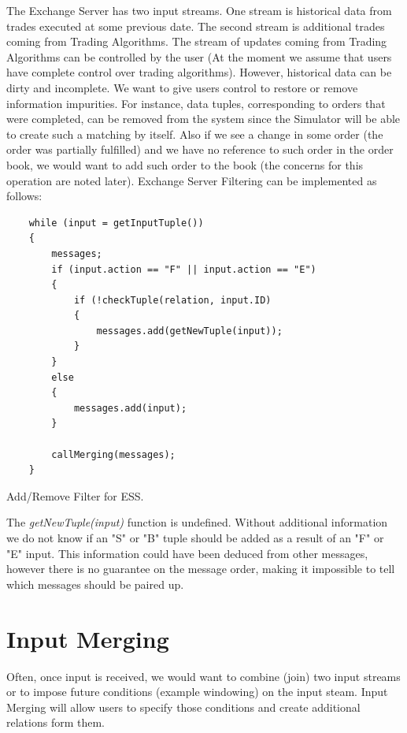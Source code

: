 \documentclass{article}
\begin{document}
The Exchange Server has two input streams. One stream is historical data from trades executed at some previous date. The second stream is additional trades coming from Trading Algorithms. The stream of updates coming from Trading Algorithms can be controlled by the user (At the moment we assume that users have complete control over trading algorithms). However, historical data can be dirty and incomplete. We want to give users control to restore or remove information impurities. For instance, data tuples, corresponding to orders that were completed, can be removed from the system since the Simulator will be able to create such a matching by itself. Also if we see a change in some order (the order was partially fulfilled) and we have no reference to such order in the order book, we would want to add such order to the book (the concerns for this operation are noted later).
Exchange Server Filtering can be implemented as follows:

\begin{program}
    \begin{verbatim}   
    while (input = getInputTuple())
    {
        messages;
        if (input.action == "F" || input.action == "E")
        {
            if (!checkTuple(relation, input.ID)
            {
                messages.add(getNewTuple(input));
            }
        }
        else
        {
            messages.add(input);
        }
        
        callMerging(messages);
    }
    \end{verbatim}
\caption{Add/Remove Filter for ESS.}
\end{program}

\noindent The \emph{getNewTuple(input)} function is undefined. Without additional information we do not know if an "S" or "B" tuple should be added as a result of an "F" or "E" input. This information could have been deduced from other messages, however there is no guarantee on the message order, making it impossible to tell which messages should be paired up. 

\section{Input Merging}

Often, once input is received, we would want to combine (join) two input streams or to impose future conditions (example windowing) on the input steam. Input Merging will allow users to specify those conditions and create additional relations form them.
\end{document}
